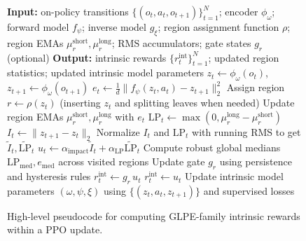 \begin{figure}[!hbp]
\centering
\small
\begin{minipage}{0.98\linewidth}
\begin{algorithmic}[1]
\STATE \textbf{Input:} on-policy transitions $\{(o_t,a_t,o_{t+1})\}_{t=1}^N$; encoder $\phi_\omega$; forward model $f_\psi$; inverse model $g_\xi$; region assignment function $\rho$; region EMAs $\mu^{\mathrm{short}}_r,\mu^{\mathrm{long}}_r$; RMS accumulators; gate states $g_r$ (optional)
\STATE \textbf{Output:} intrinsic rewards $\{r_t^{\mathrm{int}}\}_{t=1}^N$; updated region statistics; updated intrinsic model parameters
    \STATE $z_t \gets \phi_\omega(o_t)$, $z_{t+1}\gets \phi_\omega(o_{t+1})$
    \STATE $e_t \gets \frac{1}{d}\lVert f_\psi(z_t,a_t)-z_{t+1}\rVert_2^2$
    \STATE Assign region $r \gets \rho(z_t)$ (inserting $z_t$ and splitting leaves when needed)
    \STATE Update region EMAs $\mu^{\mathrm{short}}_r,\mu^{\mathrm{long}}_r$ with $e_t$
    \STATE $\mathrm{LP}_t \gets \max(0,\mu^{\mathrm{long}}_r-\mu^{\mathrm{short}}_r)$
    \STATE $I_t \gets \lVert z_{t+1}-z_t\rVert_2$
    \STATE Normalize $I_t$ and $\mathrm{LP}_t$ with running RMS to get $\widetilde{I}_t,\widetilde{\mathrm{LP}}_t$
    \STATE $u_t \gets \alpha_{\mathrm{impact}}\widetilde{I}_t + \alpha_{\mathrm{LP}}\widetilde{\mathrm{LP}}_t$
        \STATE Compute robust global medians $\mathrm{LP}_{\mathrm{med}}, e_{\mathrm{med}}$ across visited regions
        \STATE Update gate $g_r$ using persistence and hysteresis rules
        \STATE $r_t^{\mathrm{int}} \gets g_r\,u_t$
    \ELSE
        \STATE $r_t^{\mathrm{int}} \gets u_t$
    \ENDIF
\ENDFOR
\STATE Update intrinsic model parameters $(\omega,\psi,\xi)$ using $\{(z_t,a_t,z_{t+1})\}$ and supervised losses
\end{algorithmic}
\end{minipage}
\caption{High-level pseudocode for computing GLPE-family intrinsic rewards within a PPO update.}
\label{fig:algorithm_glpe}
\end{figure}
